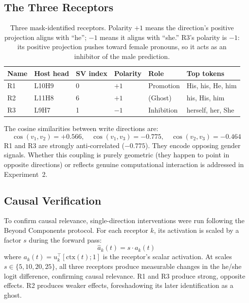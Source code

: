 \documentclass[11pt,a4paper]{article}
\begin{document}
\subsection{The Three Receptors}

\begin{table}[H]
\centering
\begin{tabular}{llllll}
\toprule
Name & Host head & SV index & Polarity & Role & Top tokens \\
\midrule
R1 & L10H9 & 0 & $+1$ & Promotion & His, his, He, him \\
R2 & L11H8 & 6 & $+1$ & (Ghost) & his, His, him \\
R3 & L9H7  & 1 & $-1$ & Inhibition & herself, her, She \\
\bottomrule
\end{tabular}
\caption{Three mask-identified receptors. Polarity $+1$ means the direction's positive projection aligns with ``he''; $-1$ means it aligns with ``she.'' R3's polarity is $-1$: its positive projection pushes toward female pronouns, so it acts as an inhibitor of the male prediction.}
\label{tab:receptors}
\end{table}

The cosine similarities between write directions are:
\begin{equation}
\cos(v_1, v_2) = +0.566, \quad \cos(v_1, v_3) = -0.775, \quad \cos(v_2, v_3) = -0.464
\end{equation}
R1 and R3 are strongly anti-correlated ($-0.775$). They encode opposing gender signals. Whether this coupling is purely geometric (they happen to point in opposite directions) or reflects genuine computational interaction is addressed in Experiment~2.

\subsection{Causal Verification}

To confirm causal relevance, single-direction interventions were run following the Beyond Components protocol. For each receptor $k$, its activation is scaled by a factor $s$ during the forward pass:
\begin{equation}
\hat{a}_k(t) = s \cdot a_k(t)
\end{equation}
where $a_k(t) = u_k^\top [\text{ctx}(t); 1]$ is the receptor's scalar activation. At scales $s \in \{5, 10, 20, 25\}$, all three receptors produce measurable changes in the he/she logit difference, confirming causal relevance. R1 and R3 produce strong, opposite effects. R2 produces weaker effects, foreshadowing its later identification as a ghost.
\end{document}
